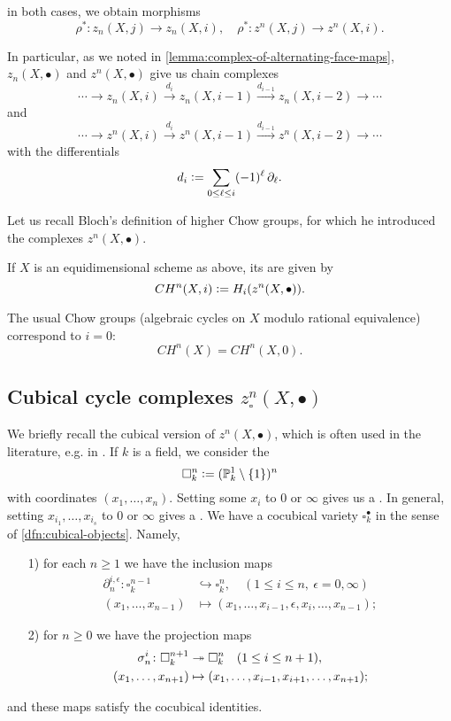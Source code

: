 \noindent in both cases, we obtain morphisms
$$\rho^*\colon z_n (X,j) \to z_n (X,i), \quad \rho^*\colon z^n (X,j) \to z^n (X,i).$$

In particular, as we noted in \ref{lemma:complex-of-alternating-face-maps},
$z_n (X,\bullet)$ and $z^n (X,\bullet)$ give us chain complexes
\[ \cdots \to z_n (X,i) \xrightarrow{d_i} z_n (X,{i-1})
  \xrightarrow{d_{i-1}} z_n (X,{i-2}) \to \cdots \]
and
\[ \cdots \to z^n (X,i) \xrightarrow{d_i} z^n (X,{i-1})
  \xrightarrow{d_{i-1}} z^n (X,{i-2}) \to \cdots \]
with the differentials
$$d_i \mathrel{\mathop:}= \sum_{0\le \ell\le i} (-1)^\ell\,\partial_\ell.$$

Let us recall Bloch's definition of higher Chow groups, for which he introduced
the complexes $z^n (X,\bullet)$.

\begin{definition}
  If $X$ is an equidimensional scheme as above, its 
  are given by
  $$CH^n (X,i) \mathrel{\mathop:}= H_i (z^n (X,\bullet)).$$
\end{definition}

The usual Chow groups (algebraic cycles on $X$ modulo rational equivalence)
correspond to $i = 0$:
$$CH^n (X) = CH^n (X,0).$$

\subsection*{Cubical cycle complexes $z^n_\square (X,\bullet)$}

We briefly recall the cubical version of $z^n (X,\bullet)$, which is often used
in the literature, e.g. in \cite{Levine-Bloch-revisited}. If $k$ is a field, we
consider the 
$$\square^n_k \mathrel{\mathop:}= (\mathbb{P}^1_k\setminus \{1\})^n$$
with coordinates $(x_1, \ldots, x_n)$. Setting some $x_i$ to $0$ or $\infty$
gives us a . In general, setting
$x_{i_1}, \ldots, x_{i_s}$ to $0$ or $\infty$ gives a
. We have a cocubical variety $\square^\bullet_k$ in
the sense of \ref{dfn:cubical-objects}. Namely,

\begin{enumerate}
\item[1)] for each $n\ge 1$ we have the inclusion maps
  \begin{align*}
    \partial_n^{i,\epsilon}\colon \square^{n-1}_k & \hookrightarrow \square^n_k,
                                                    \quad (1\le i \le n, ~ \epsilon = 0,\infty) \\
    (x_1, \ldots, x_{n-1}) & \mapsto (x_1, \ldots, x_{i-1}, \epsilon, x_i, \ldots, x_{n-1});
  \end{align*}

\item[2)] for $n \ge 0$ we have the projection maps
  \begin{align*}
    \sigma_n^i\colon \square^{n+1}_k & \twoheadrightarrow \square^n_k
                                       \quad (1 \le i \le n+1), \\
    (x_1, \ldots, x_{n+1}) & \mapsto (x_1, \ldots, x_{i-1}, x_{i+1}, \ldots, x_{n+1});
  \end{align*}
\end{enumerate}
and these maps satisfy the cocubical identities.

